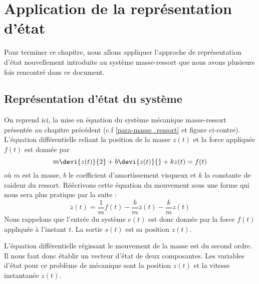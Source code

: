 \section{Application de la représentation d'état}
Pour terminer ce chapitre, nous allons appliquer l'approche de représentation
d'état nouvellement introduite au système masse-ressort que nous avons 
plusieurs fois rencontré dans ce document. 
\subsection{Représentation d'état du système}
On reprend ici, la mise en équation du système mécanique masse-ressort 
présentée au chapitre précédent (c.f \cref{para-masse_ressort} et figure 
ci-contre). L'équation différentielle reliant la position de la masse $z(t)$ et 
la force appliquée $f(t)$ est donnée par 
\[
m\devi{z(t)}{2}+b\devi{z(t)}{}+kz(t)=f(t)
\]
où $m$ est la masse, $b$ le coefficient d'amortissement visqueux et $k$ la
constante de raideur du ressort. 
Réécrivons cette équation du mouvement sous une forme qui nous sera plus
pratique par la suite :
\[
    \ddot{z}(t)=\dfrac{1}{m}f(t)-\dfrac{b}{m}\dot{z}(t)-\dfrac{k}{m}z(t)
\]
Nous rappelons que l'entrée du système $e(t)$ est donc donnée par la force 
$f(t)$ appliquée à l'instant $t$. La sortie $s(t)$ est sa position $z(t)$.
\begin{marginfigure}
    \centering
    
\end{marginfigure}
L'équation différentielle régissant le mouvement de la masse est du second 
ordre. Il nous faut donc établir un vecteur d'état de deux composantes.
Les variables d'état pour ce problème de mécanique sont la 
position $z(t)$ et la vitesse instantanée $\dot{z}(t)$.
